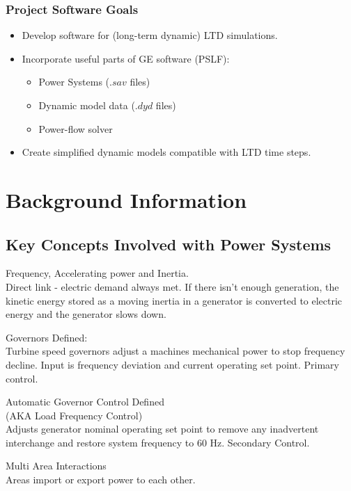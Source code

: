\documentclass[14pt, unknownkeysallowed]{beamer}
\begin{document}
\begin{frame}
\frametitle{Project Software Goals}
\begin{itemize}
\item Develop software for (long-term dynamic) LTD simulations.
\item Incorporate useful parts of GE software (PSLF):
\begin{itemize}
	\item Power Systems ($.sav$ files)
	\item Dynamic model data ($.dyd$ files)
	\item Power-flow solver
\end{itemize}
\item Create simplified dynamic models compatible with LTD time steps.
\end{itemize}
\end{frame}

\section{Background Information}
\subsection{Key Concepts Involved with Power Systems}
\begin{frame}
Frequency, Accelerating power and Inertia.\\
Direct link - electric demand always met. If there isn't enough generation, the kinetic energy stored as a moving inertia in a generator is converted to electric energy and the generator slows down.
\end{frame}
\begin{frame}
Governors Defined:\\
Turbine speed governors adjust a machines mechanical power to stop frequency decline. Input is frequency deviation and current operating set point. Primary control.
\end{frame}
\begin{frame}
Automatic Governor Control Defined\\
(AKA Load Frequency Control)
\\
Adjusts generator nominal operating set point to remove any inadvertent interchange and restore system frequency to 60 Hz. Secondary Control.
\end{frame}
\begin{frame}
Multi Area Interactions \\

Areas import or export power to each other.
\end{frame}
\end{document}
